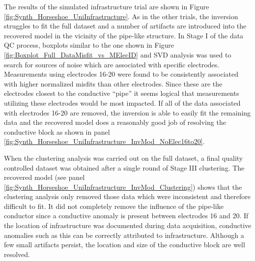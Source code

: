 \documentclass[final,authoryear,5p,times,twocolumn]{elsarticle}
\begin{document}
The results of the simulated infrastructure trial are shown in Figure \ref{fig:Synth_Horseshoe_UniInfrastructure}. As in the other trials, the inversion struggles to fit the full dataset and a number of artifacts are introduced into the recovered model in the vicinity of the pipe-like structure. In Stage I of the data QC process, boxplots similar to the one shown in Figure \ref{fig:Boxplot_Full_DataMisfit_vs_MElecID} and SVD analysis was used to search for sources of noise which are associated with specific electrodes. Measurements using electrodes 16-20 were found to be consistently associated with higher normalized misfits than other electrodes. Since these are the electrodes closest to the conductive ``pipe'' it seems logical that measurements utilizing these electrodes would be most impacted. If all of the data associated with electrodes 16-20 are removed, the inversion is able to easily fit the remaining data and the recovered model does a reasonably good job of resolving the conductive block as shown in panel \ref{fig:Synth_Horseshoe_UniInfrastructure_InvMod_NoElec16to20}. 

When the clustering analysis was carried out on the full dataset, a final quality controlled dataset was obtained after a single round of Stage III clustering. The recovered model (see panel \ref{fig:Synth_Horseshoe_UniInfrastructure_InvMod_Clustering}) shows that the clustering analysis only removed those data which were inconsistent and therefore difficult to fit. It did not completely remove the influence of the pipe-like conductor since a conductive anomaly is present between electrodes 16 and 20. If the location of infrastructure was documented during data acquisition, conductive anomalies such as this can be correctly attributed to infrastructure. Although a few small artifacts persist, the location and size of the conductive block are well resolved.  
\end{document}

